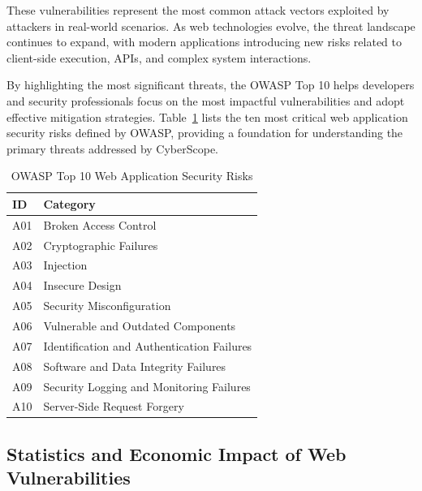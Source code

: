 \indent These vulnerabilities represent the most common attack vectors exploited by attackers in real-world scenarios. As web technologies evolve, the threat landscape continues to expand, with modern applications introducing new risks related to client-side execution, APIs, and complex system interactions.

\indent By highlighting the most significant threats, the OWASP Top 10 helps developers and security professionals focus on the most impactful vulnerabilities and adopt effective mitigation strategies. Table~\ref{tab:owasp-top10} lists the ten most critical web application security risks defined by OWASP, providing a foundation for understanding the primary threats addressed by CyberScope.

\vspace{0.3cm}

\begin{table}[H]
    \centering
    \caption{OWASP Top 10 Web Application Security Risks}
    \label{tab:owasp-top10}
    \renewcommand{\arraystretch}{1.25}
    \begin{tabularx}{\textwidth}{|p{2cm}|X|}
        \hline
        \textbf{ID} & \textbf{Category} \\
        \hline
        A01 & Broken Access Control \\
        \hline
        A02 & Cryptographic Failures \\
        \hline
        A03 & Injection \\
        \hline
        A04 & Insecure Design \\
        \hline
        A05 & Security Misconfiguration \\
        \hline
        A06 & Vulnerable and Outdated Components \\
        \hline
        A07 & Identification and Authentication Failures \\
        \hline
        A08 & Software and Data Integrity Failures \\
        \hline
        A09 & Security Logging and Monitoring Failures \\
        \hline
        A10 & Server-Side Request Forgery \\
        \hline
    \end{tabularx}
\end{table}

\subsection{Statistics and Economic Impact of Web Vulnerabilities}

